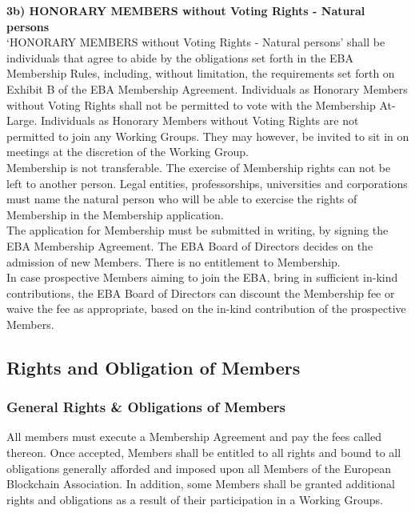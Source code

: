 \documentclass{article}
\begin{document}
\textbf{3b) HONORARY MEMBERS without Voting Rights - Natural persons} \\

‘HONORARY MEMBERS without Voting Rights - Natural persons’ shall be individuals that agree to abide by the obligations set forth in the EBA Membership Rules, including, without limitation, the requirements set forth on Exhibit B of the EBA Membership Agreement. 
Individuals as Honorary  Members without Voting Rights shall not be permitted to vote with the Membership At-Large. Individuals as Honorary Members without Voting Rights are not permitted to join any Working Groups. They may however, be invited to sit in on meetings at the discretion of the Working Group. \\

Membership is not transferable. 
The exercise of Membership rights can not be left to another person. Legal entities, professorships, universities and corporations must name the natural person who will be able to exercise the rights of Membership in the Membership application. \\ 

The application for Membership must be submitted in writing, by signing the EBA Membership Agreement. The EBA Board of Directors decides on the admission of new Members. There is no entitlement to Membership. \\

In case prospective Members aiming to join the EBA, bring in sufficient in-kind contributions, the EBA Board of Directors can discount the Membership fee or waive the fee as appropriate, based on the in-kind contribution of the prospective Members.

\subsection{Rights and Obligation of Members}

\subsubsection{General Rights \& Obligations of Members}

All members must execute a Membership Agreement and pay the fees called thereon. 
Once accepted, Members shall be entitled to all rights and bound to all obligations generally afforded and imposed upon all Members of the European Blockchain Association. 
In addition, some Members shall be granted additional rights and obligations as a result of their participation in a Working Groups. \\
\end{document}
